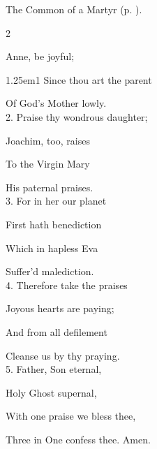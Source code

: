 
\begin{rubric}
	The Common of a Martyr (p. \pageref{CommonMartyrNotBishopCollect}).
\end{rubric}


\clearpage
{}

\begin{paracol}{2}
\sloppy

\firstEvensong
{}

\firstEvensongHymn
{} Anne, be joyful;


\begin{hangparas}{1.25em}{1}
Since thou art the parent

Of God’s Mother lowly.\\

2. Praise thy wondrous daughter;

Joachim, too, raises

To the Virgin Mary

His paternal praises.\\

3. For in her our planet

First hath benediction

Which in hapless Eva

Suffer'd malediction.\\

4. Therefore take the praises

Joyous hearts are paying;

And from all defilement

Cleanse us by thy praying.\\

5. Father, Son eternal,

Holy Ghost supernal,

With one praise we bless thee,

Three in One confess thee. Amen.\\
\end{hangparas}


\end{paracol}
